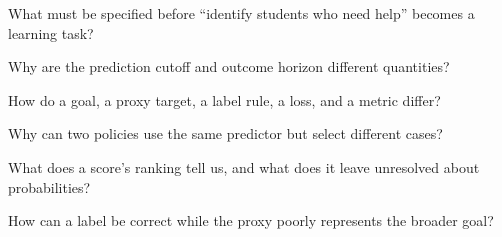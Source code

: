 \begin{samepage}
\begin{studyquestions}
\item What must be specified before ``identify students who need help'' becomes a learning task?
\item Why are the prediction cutoff and outcome horizon different quantities?
\item How do a goal, a proxy target, a label rule, a loss, and a metric differ?
\item Why can two policies use the same predictor but select different cases?
\item What does a score's ranking tell us, and what does it leave unresolved about probabilities?
\item How can a label be correct while the proxy poorly represents the broader goal?
\end{studyquestions}
\end{samepage}

